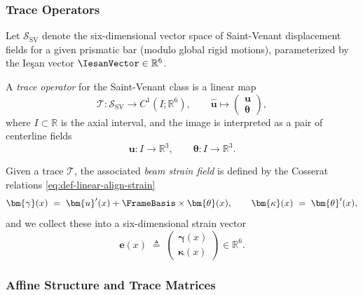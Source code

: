 \subsubsection{Trace Operators}

\begin{definition}
\label{def:sv-trace}
Let $\mathcal{S}_{\mathrm{SV}}$ denote the six-dimensional vector space of 
Saint-Venant displacement fields for a given prismatic bar (modulo global rigid 
motions), parameterized by the Ie\c{s}an vector $\IesanVector \in \mathbb{R}^6$.

A \emph{trace operator} for the Saint-Venant class is a linear map
\[
\mathcal{T} : \mathcal{S}_{\mathrm{SV}} \to C^1(I;\mathbb{R}^6),
\qquad
\hat{\bm{u}} \mapsto 
\begin{pmatrix}
\bm{u} \\[2pt] \bm{\theta}
\end{pmatrix},
\]
where $I \subset \mathbb{R}$ is the axial interval, and the image is interpreted 
as a pair of centerline fields
\[
\bm{u} : I \to \mathbb{R}^3,
\qquad
\bm{\theta} : I \to \mathbb{R}^3.
\]

Given a trace $\mathcal{T}$, the associated \emph{beam strain field} is defined 
by the Cosserat relations \eqref{eq:def-linear-align-strain}
\begin{equation}
\bm{\gamma}(x) 
\;=\;
\bm{u}'(x) + \FrameBasis \times \bm{\theta}(x),
\qquad
\bm{\kappa}(x)
\;=\;
\bm{\theta}'(x),
\label{eq:beam-strains-from-trace}
\end{equation}
and we collect these into a six-dimensional strain vector
\[
\bm{e}(x) 
\;\triangleq\;
\begin{pmatrix}
\bm{\gamma}(x) \\[2pt] \bm{\kappa}(x)
\end{pmatrix} \in \mathbb{R}^6.
\]
\end{definition}


\subsubsection{Affine Structure and Trace Matrices}

